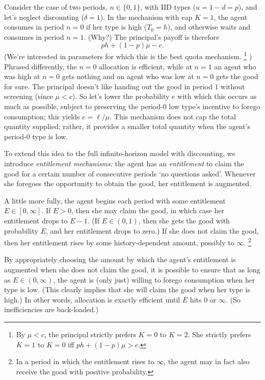 Consider the case of two periods, $n \in \{0,1\}$, 
with IID types ($u = 1-d = p$),
and let's neglect discounting ($\delta=1$).
In the mechanism with cap $K=1$,
the agent consumes in period $n=0$ if her type is high ($T_0=h$),
and otherwise waits and consumes in period $n=1$. (Why?)
The principal's payoff is therefore
%
\begin{equation*}
	p h + (1-p) \mu - c.
\end{equation*}
%
(We're interested in parameters for which this is the best quota mechanism.%
	\footnote{By $\mu<c$, the principal strictly prefers $K=0$ to $K=2$.
	She strictly prefers $K=1$ to $K=0$ iff $p h + (1-p) \mu > c$.}%
)
Phrased differently, the $n=0$ allocation is efficient,
while at $n=1$ an agent who was high at $n=0$ gets nothing
and an agent who was low at $n=0$ gets the good for sure.
The principal doesn't like handing out the good in period $1$ without screening (since $\mu < c$).
So let's lower the probability $e$ with which this occurs
as much as possible, subject to preserving the period-$0$ low type's incentive to forego consumption; this yields $e = \ell / \mu$.
This mechanism does not cap the total quantity supplied; rather, it provides a smaller total quantity when the agent's period-$0$ type is low.


To extend this idea to the full infinite-horizon model with discounting,
we introduce \emph{entitlement mechanisms:}
the agent has an \emph{entitlement} to claim the good for a certain number of consecutive periods `no questions asked'.
Whenever she foregoes the opportunity to obtain the good, her entitlement is augmented.

A little more fully, the agent begins each period with some entitlement $E \in [0,\infty]$.
If $E>0$, then she may claim the good, in which case her entitlement drops to $E-1$.
(If $E \in (0,1)$, then she gets the good with probability $E$, and her entitlement drops to zero.)
If she does not claim the good, then her entitlement rises by some history-dependent amount, possibly to $\infty$.%
	\footnote{In a period in which the entitlement rises to $\infty$, the agent may in fact also receive the good with positive probability.}

By appropriately choosing the amount by which the agent's entitlement is augmented when she does not claim the good, it is possible to ensure that as long as $E \in (0,\infty)$, the agent is (only just) willing to forego consumption when her type is low. (This clearly implies that she will claim the good when her type is high.)
In other words, allocation is exactly efficient until $E$ hits $0$ or $\infty$.
(So inefficiencies are back-loaded.)

